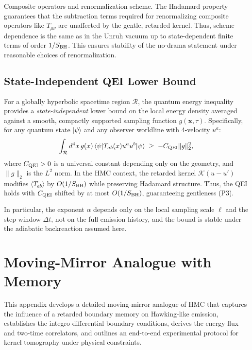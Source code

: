 \documentclass[11pt,a4paper]{article}
\newcommand{\HMC}{\textsc{HMC}\xspace}
\theoremstyle{plain}
\theoremstyle{definition}
\theoremstyle{remark}
\begin{document}
Composite operators and renormalization scheme. The Hadamard property guarantees that the subtraction terms required for renormalizing composite operators like $T_{\mu\nu}$ are unaffected by the gentle, retarded kernel. Thus, scheme dependence is the same as in the Unruh vacuum up to state-dependent finite terms of order $1/S_{\rm BH}$. This ensures stability of the no-drama statement under reasonable choices of renormalization.

\subsection{State-Independent QEI Lower Bound}
For a globally hyperbolic spacetime region $\mathcal{R}$, the quantum energy inequality provides a \emph{state-independent} lower bound on the local energy density averaged against a smooth, compactly supported sampling function $g(\mathbf{x},\tau)$. Specifically, for any quantum state $|\psi\rangle$ and any observer worldline with 4-velocity $u^a$:
\begin{equation}
\int_{\mathcal{R}} d^4x\, g(x)\,\langle\psi| T_{ab}(x)u^a u^b|\psi\rangle \;\ge\; -C_{\rm QEI}\|g\|_2^2,
\end{equation}
where $C_{\rm QEI}>0$ is a universal constant depending only on the geometry, and $\|g\|_2$ is the $L^2$ norm. In the \HMC{} context, the retarded kernel $\mathcal{K}(u-u')$ modifies $\langle T_{ab}\rangle$ by $O(1/S_{\rm BH})$ while preserving Hadamard structure. Thus, the QEI holds with $C_{\rm QEI}$ shifted by at most $O(1/S_{\rm BH})$, guaranteeing gentleness (P3).

\noindent In particular, the exponent \(\alpha\) depends only on the local sampling scale \(\ell\) and the step window \(\Delta t\), not on the full emission history, and the bound is stable under the adiabatic backreaction assumed here.


\section{Moving-Mirror Analogue with Memory}
\label{app:moving_mirror} %
This appendix develops a detailed moving-mirror analogue of \HMC{} that captures the influence of a retarded boundary memory on Hawking-like emission, establishes the integro-differential boundary conditions, derives the energy flux and two-time correlators, and outlines an end-to-end experimental protocol for kernel tomography under physical constraints.
\end{document}
